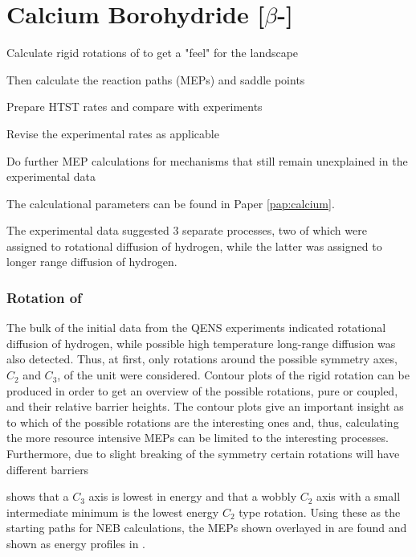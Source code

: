 \section{Calcium Borohydride [$\beta$-]}
\label{sec:borohydrides-calcium}

\bit
\item Calculate rigid rotations of  to get a "feel" for the landscape
\item Then calculate the reaction paths (MEPs) and saddle points
\item Prepare HTST rates and compare with experiments
\item Revise the experimental rates as applicable
\item Do further MEP calculations for mechanisms that still remain unexplained in the experimental data
\eit

The calculational parameters can be found in Paper \ref{pap:calcium}.

The experimental data suggested 3 separate processes, two of which were assigned to rotational diffusion of hydrogen, while the latter was assigned to longer range diffusion of hydrogen.

\subsubsection{Rotation of }
The bulk of the initial data from the QENS experiments indicated rotational diffusion of hydrogen, while possible high temperature long-range diffusion was also detected.
Thus, at first, only rotations around the possible symmetry axes, $C_2$ and $C_3$, of the  unit were considered.
Contour plots of the rigid rotation can be produced in order to get an overview of the possible rotations, pure or coupled, and their relative barrier heights.
The contour plots give an important insight as to which of the possible rotations are the interesting ones and, thus, calculating the more resource intensive MEPs can be limited to the interesting processes.
Furthermore, due to slight breaking of the symmetry certain rotations will have different barriers \expand

 shows that a $C_3$ axis is lowest in energy and that a wobbly $C_2$ axis with a small intermediate minimum is the lowest energy $C_2$ type rotation.
Using these as the starting paths for NEB calculations, the MEPs shown overlayed in  are found and shown as energy profiles in .

